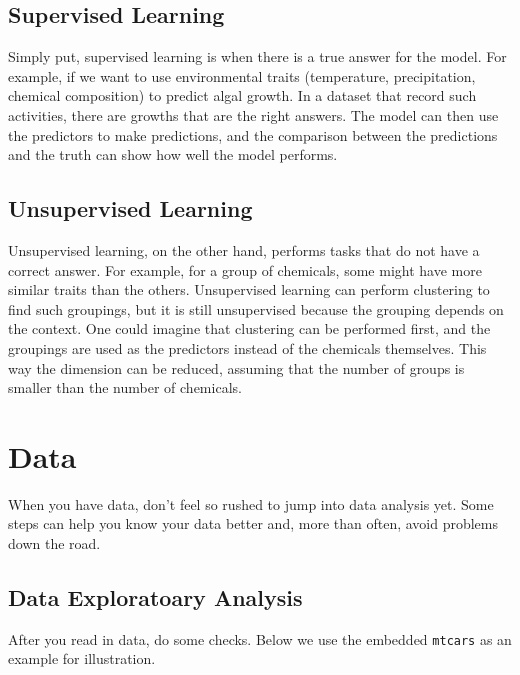 \documentclass[
]{book}
\begin{document}
\hypertarget{supervised-learning}{%
\section{Supervised Learning}\label{supervised-learning}}

Simply put, supervised learning is when there is a true answer for the model. For example, if we want to use environmental traits (temperature, precipitation, chemical composition) to predict algal growth. In a dataset that record such activities, there are growths that are the right answers. The model can then use the predictors to make predictions, and the comparison between the predictions and the truth can show how well the model performs.

\hypertarget{unsupervised-learning}{%
\section{Unsupervised Learning}\label{unsupervised-learning}}

Unsupervised learning, on the other hand, performs tasks that do not have a correct answer. For example, for a group of chemicals, some might have more similar traits than the others. Unsupervised learning can perform clustering to find such groupings, but it is still unsupervised because the grouping depends on the context. One could imagine that clustering can be performed first, and the groupings are used as the predictors instead of the chemicals themselves. This way the dimension can be reduced, assuming that the number of groups is smaller than the number of chemicals.

\hypertarget{data}{%
\chapter{Data}\label{data}}

When you have data, don't feel so rushed to jump into data analysis yet. Some steps can help you know your data better and, more than often, avoid problems down the road.

\hypertarget{data-exploratoary-analysis}{%
\section{Data Exploratoary Analysis}\label{data-exploratoary-analysis}}

After you read in data, do some checks. Below we use the embedded \texttt{mtcars} as an example for illustration.
\end{document}

